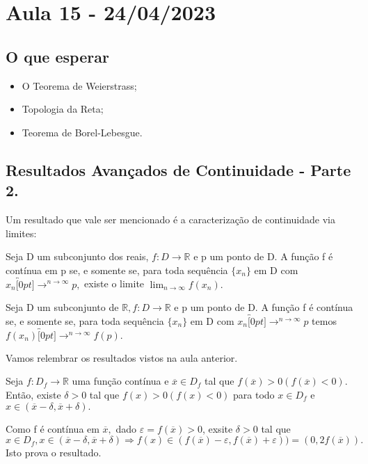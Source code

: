 \documentclass[Analysis/analysis_notes.tex]{subfiles}
\begin{document}
\section{Aula 15 - 24/04/2023}
\subsection{O que esperar}
\begin{itemize}
	\item O Teorema de Weierstrass;
	\item Topologia da Reta;
	\item Teorema de Borel-Lebesgue.
\end{itemize}
\subsection{Resultados Avan\c cados de Continuidade - Parte 2.}
Um resultado que vale ser mencionado \'e a caracteriza\c c\~ao de continuidade via limites:
\begin{theorem*}
	Seja D um subconjunto dos reais, $f:D\rightarrow \mathbb{R}$ e p um ponto de D. A fun\c c\~ao f \'e cont\'inua em p se, e somente
	se, para toda sequ\^encia $\{x_{n}\}$ em D com $x_{n}\overbracket[0pt]{\longrightarrow}^{n\to \infty}p,$ existe o limite $\lim_{n\to \infty}f(x_{n}).$
\end{theorem*}
\begin{crl*}
	Seja D um subconjunto de $\mathbb{R}, f:D\rightarrow \mathbb{R} $ e p um ponto de D. A fun\c c\~ao f \'e cont\'inua se, e somente
	se, para toda sequ\^encia $\{x_{n}\}$ em D com $x_{n}\overbracket[0pt]{\longrightarrow}^{n\to \infty}p$ temos $f(x_{n})\overbracket[0pt]{\longrightarrow}^{n\to \infty}f(p).$
\end{crl*}
Vamos relembrar os resultados vistos na aula anterior.
\begin{theorem*}
	Seja $f:D_{f}\rightarrow \mathbb{R}$ uma fun\c c\~ao cont\'inua e $\overline{x}\in D_{f}$ tal que $f(\overline{x})>0(f(\overline{x})<0).$
	Ent\~ao, existe $\delta>0$ tal que $f(x)>0(f(x)<0)$ para todo $x\in D_{f}$ e $x\in(\overline{x}-\delta, \overline{x}+\delta).$
\end{theorem*}
\begin{proof*}
	Como f \'e cont\'inua em $\overline{x},$ dado $\varepsilon = f(\overline{x}) >0$, exsite $\delta > 0$ tal que
	$$
		x\in D_{f}, x\in(\overline{x}-\delta, \overline{x}+\delta) \Rightarrow f(x)\in (f(\overline{x})-\varepsilon, f(\overline{x})+\varepsilon)) =
		(0, 2f(\overline{x})).
	$$
	Isto prova o resultado. \qedsymbol
\end{proof*}
\end{document}
